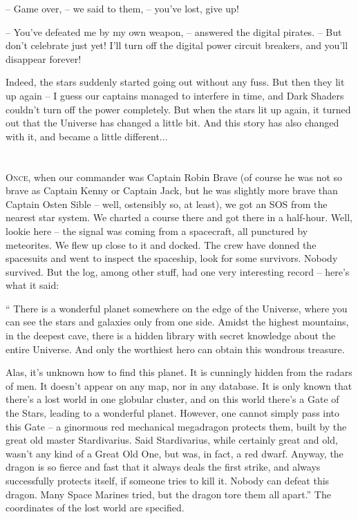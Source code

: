 \documentclass[ebook,oneside,final,openright]{memoir}
\begin{document}
– Game over, – we said to them, – you’ve lost, give up!\par
– You’ve defeated me by my own weapon, – answered the digital pirates. – But don’t celebrate just yet! I’ll turn off the digital power circuit breakers, and you’ll disappear forever!\par
\par
Indeed, the stars suddenly started going out without any fuss. But then they lit up again – I guess our captains managed to interfere in time, and Dark Shaders couldn’t turn off the power completely. But when the stars lit up again, it turned out that the Universe has changed a little bit. And this story has also changed with it, and became a little different...\par

\chapter{}
\par
\lettrine{O}{nce,} when our commander was Captain Robin Brave (of course he was not so brave as Captain Kenny or Captain Jack, but he was slightly more brave than Captain Osten Sible – well, ostensibly so, at least), we got an SOS from the nearest star system. We charted a course there and got there in a half-hour. Well, lookie here – the signal was coming from a spacecraft, all punctured by meteorites. We flew up close to it and docked. The crew have donned the spacesuits and went to inspect the spaceship, look for some survivors. Nobody survived. But the log, among other stuff, had one very interesting record – here’s what it said:\par
\par
“ There is a wonderful planet somewhere on the edge of the Universe, where you can see the stars and galaxies only from one side. Amidst the highest mountains, in the deepest cave, there is a hidden library with secret knowledge about the entire Universe. And only the worthiest hero can obtain this wondrous treasure. \par
Alas, it’s unknown how to find this planet. It is cunningly hidden from the radars of men. It doesn’t appear on any map, nor in any database. It is only known that there’s a lost world in one globular cluster, and on this world there’s a Gate of the Stars, leading to a wonderful planet. However, one cannot simply pass into this Gate – a ginormous red mechanical megadragon protects them, built by the great old master Stardivarius. Said Stardivarius, while certainly great and old, wasn’t any kind of a Great Old One, but was, in fact, a red dwarf. Anyway, the dragon is so fierce and fast that it always deals the first strike, and always successfully protects itself, if someone tries to kill it. Nobody can defeat this dragon. Many Space Marines tried, but the dragon tore them all apart.” The coordinates of the lost world are specified.\par
\end{document}
